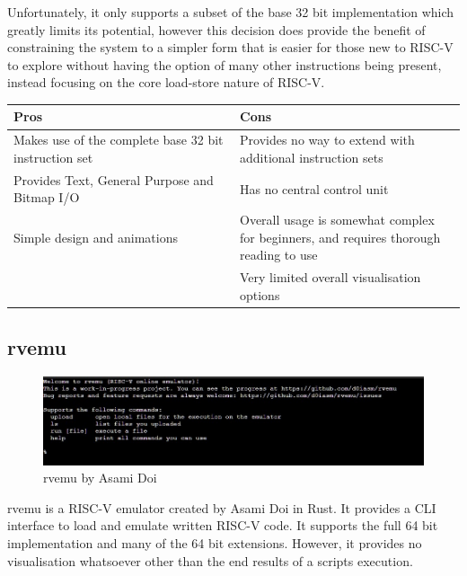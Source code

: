 Unfortunately, it only supports a subset of the base 32 bit implementation which greatly limits its potential, however this decision does provide the benefit of constraining the system to a simpler form that is easier for those new to RISC-V to explore without having the option of many other instructions being present, instead focusing on the core load-store nature of RISC-V.

\begin{table}[h]
\begin{tabular}{|p{0.5\linewidth} | p{0.5\linewidth}|}
\hline
\textbf{Pros}                                         & \textbf{Cons}                                                                         \\ \hline
Makes use of the complete base 32 bit instruction set & Provides no way to extend with additional instruction sets                            \\ \hline
Provides Text, General Purpose and Bitmap I/O         & Has no central control unit                                                           \\ \hline
Simple design and animations                          & Overall usage is somewhat complex for beginners, and requires thorough reading to use \\ \hline
                                                      &  Very limited overall visualisation options                                                                                      \\ \hline
\end{tabular}
\end{table}

\subsection{rvemu}
\begin{figure}[H]
    \centering
    \includegraphics[width=0.85\linewidth]{dissertation/DATA/RVEMU.jpg}
    \caption{rvemu by Asami Doi}
    \label{fig:rvemu}
\end{figure}
rvemu \cite{doi_2021_d0iasmrvemu} is a RISC-V emulator created by Asami Doi in Rust. It provides a CLI interface to load and emulate written RISC-V code. It supports the full 64 bit implementation and many of the 64 bit extensions. However, it provides no visualisation whatsoever other than the end results of a scripts execution.

